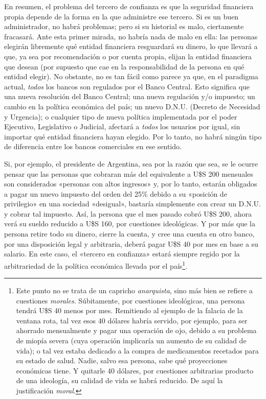 \documentclass[12pt,a4paper,twoside]{book}
\begin{document}
En resumen, el problema del tercero de confianza es que la seguridad financiera propia depende de la forma en la que administre ese tercero. Si es un buen administrador, no habrá problemas; pero si su historial es malo, ciertamente fracasará. Ante esta primer mirada, no habría nada de malo en ella: las personas elegirán libremente qué entidad financiera resguardará su dinero, lo que llevará a que, ya sea por recomendación o por cuenta propia, elijan la entidad financiera que desean (por supuesto que cae en la responsabilidad de la persona en qué entidad elegir). No obstante, no es tan fácil como parece ya que, en el paradigma actual, \textit{todos} los bancos son regulados por el Banco Central. Esto significa que una nueva resolución del Banco Central; una nueva regulación y/o impuesto; un cambio en la política económica del país; un nuevo D.N.U. (Decreto de Necesidad y Urgencia); o cualquier tipo de nueva política implementada por el poder Ejecutivo, Legislativo o Judicial, afectará a \textit{todos} los usuarios por igual, sin importar qué entidad financiera hayan elegido. Por lo tanto, no habrá ningún tipo de diferencia entre los bancos comerciales en ese sentido.

Si, por ejemplo, el presidente de Argentina, sea por la razón que sea, se le ocurre pensar que las personas que cobraran más del equivalente a U\$S 200 mensuales son considerados «personas con altos ingresos» y, por lo tanto, estarán obligados a pagar un nuevo impuesto del orden del 25\% debido a su «posición de privilegio» en una sociedad «desigual», bastaría simplemente con crear un D.N.U. y cobrar tal impuesto. Así, la persona que el mes pasado cobró U\$S 200, ahora verá su sueldo reducido a U\$S 160, por cuestiones ideológicas. Y por más que la persona retire todo su dinero, cierre la cuenta, y cree una cuenta en otro banco, por una disposición legal y arbitraria, deberá pagar U\$S 40 por mes en base a su salario. En este caso, el «tercero en confianza» estará siempre regido por la arbitrariedad de la política económica llevada por el país\footnote{Este punto no se trata de un capricho \textit{anarquista}, sino más bien se refiere a cuestiones \textit{morales}. Súbitamente, por cuestiones ideológicas, una persona tendrá U\$S 40 menos por mes. Remitiendo al ejemplo de la falacia de la ventana rota, tal vez esos 40 dólares habría servido, por ejemplo, para ser ahorrado mensualmente y pagar una operación de ojo, debido a su problema de miopía severa (cuya operación implicaría un aumento de su calidad de vida); o tal vez estaba dedicado a la compra de medicamentos recetados para su estado de salud. Nadie, salvo esa persona, sabe qué proyecciones económicas tiene. Y quitarle 40 dólares, por cuestiones arbitrarias producto de una ideología, su calidad de vida se habrá reducido. De aquí la justificación \textit{moral}.}.
\end{document}
